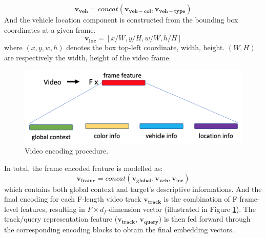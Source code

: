 \[ 
\mathbf{v_{veh}} = concat(\mathbf{v_{veh-col}}, \mathbf{v_{veh-type}})
\]
And the vehicle location component is constructed from the bounding box coordinates at a given frame.
\[
\mathbf{v_{loc}} = [x/W, y/H, w/W, h/H]
\]
where $(x, y, w, h)$ denotes the box top-left coordinate, width, height. $(W, H)$ are respectively the width, height of the video frame. 
\begin{figure}[!h]
    \centering
    \includegraphics[width=\linewidth]{resources/images/methods/video_encoding.png}
    \caption{Video encoding procedure.}
    \label{fig:video_encoding}
\end{figure}

In total, the frame encoded feature is modelled as:
\[
\mathbf{v_{frame}} = concat(\mathbf{v_{global}}, \mathbf{v_{veh}}, \mathbf{v_{loc}})
\]
which contains both global context and target's descriptive informations. And the final encoding for each F-length video track $\mathbf{v_{track}}$ is the combination of F frame-level features, resulting in $F \times d_f$-dimension vector (illustrated in Figure \ref{fig:video_encoding}).
The track/query representation feature ($\mathbf{v_{track}}$, $\mathbf{v_{query}}$) is then fed forward through the corresponding encoding blocks to obtain the final embedding vectors.

